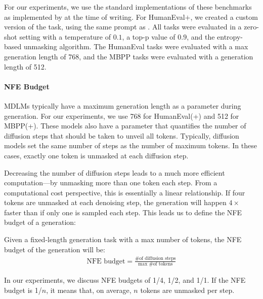 \documentclass{article}
\begin{document}
For our experiments, we use the standard  implementations of these benchmarks as implemented by  at the time of writing.  
%
For HumanEval$+$, we created a custom  version of the task, using the same prompt as .
%
All tasks were evaluated in a zero-shot setting with a temperature of $0.1$, a top-p value of $0.9$, and the entropy-based unmasking algorithm.
%
The HumanEval tasks were evaluated with a max generation length of 768, and the MBPP tasks were evaluated with a generation length of 512.
%
\paragraph{NFE Budget}
\label{app:nfe_budget}

MDLMs typically have a maximum generation length as a parameter during generation. For our experiments, we use 768 for HumanEval(+) and 512 for MBPP(+).
%
These models also have a parameter that quantifies the number of diffusion steps that should be taken to unveil all tokens.
%
Typically, diffusion models set the same number of steps as the number of maximum tokens. 
%
In these cases, exactly one token is unmasked at each diffusion step. 

Decreasing the number of diffusion steps leads to a much more efficient computation---by unmasking more than one token each step. 
%
From a computational cost perspective, this is essentially a linear relationship. 
%
If four tokens are unmasked at each denoising step, the generation will happen $4\times$ faster than if only one is sampled each step.
%
This leads us to define the NFE budget of a generation:


Given a fixed-length generation task with a max number of tokens, the NFE budget of the generation will be:
\begin{align}
    \text{NFE budget} = \frac{\text{\# of diffusion steps}}{\text{max \# of tokens}}
    \label{eq:comp_budget}
\end{align}

In our experiments, we discuss NFE budgets of 1/4, 1/2, and 1/1. If the NFE budget is 1/$n$, it means that, on average, $n$ tokens are unmasked per step. 
\end{document}
